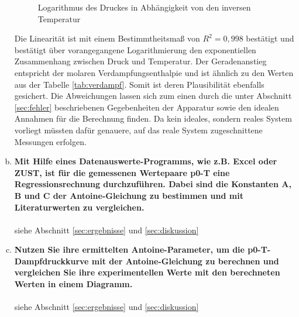 \begin{enumerate}[a)]
\begin{figure}[h!]
\begin{center}
{}
				\caption{Logarithmus des Druckes in Abhängigkeit von den inversen Temperatur}
				\label{dia:linear}
			\end{center}
		\end{figure}
		\FloatBarrier
		Die Linearität ist mit einem Bestimmtheitsmaß von $R^2=0,998$ bestätigt und bestätigt über vorangegangene Logarithmierung den exponentiellen Zusammenhang zwischen Druck und Temperatur. Der Geradenanstieg entspricht der molaren Verdampfungsenthalpie und ist ähnlich zu den Werten aus der Tabelle \ref{tab:verdampf}. Somit ist deren Plausibilität ebenfalls gesichert. Die Abweichungen lassen sich zum einen durch die unter Abschnitt \ref{sec:fehler} beschriebenen Gegebenheiten der Apparatur sowie den idealen Annahmen für die Berechnung finden. Da kein ideales, sondern reales System vorliegt müssten dafür genauere, auf das reale System zugeschnittene Messungen erfolgen.
	\newpage
	\item \textbf{Mit Hilfe eines Datenauswerte-Programms, wie z.B. Excel oder ZUST, ist für die
	gemessenen Wertepaare p0-T eine Regressionsrechnung durchzuführen. Dabei sind
	die Konstanten A, B und C der Antoine-Gleichung zu bestimmen und mit Literaturwerten zu vergleichen.}\\\\
	siehe Abschnitt \ref{sec:ergebnisse} und \ref{sec:diskussion}
	\item \textbf{Nutzen Sie ihre ermittelten Antoine-Parameter, um die p0-T-Dampfdruckkurve mit der Antoine-Gleichung zu berechnen und vergleichen Sie ihre experimentellen Werte mit den berechneten Werten in einem Diagramm.}\\ \\
	siehe Abschnitt \ref{sec:ergebnisse} und \ref{sec:diskussion}

\end{enumerate}






